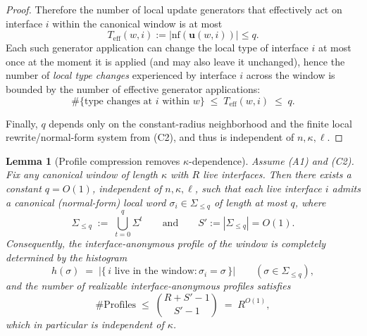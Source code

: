 \documentclass[12pt]{article}
\newtheorem{lemma}[theorem]{Lemma}
\theoremstyle{definition}
\theoremstyle{remark}
\begin{document}
\begin{proof}
Therefore the number of local update generators that effectively act on interface
$i$ within the canonical window is at most
\[
T_{\mathrm{eff}}(w,i) := |\mathrm{nf}(\mathbf{u}(w,i))| \le q.
\]
Each such generator application can change the local type of interface $i$ at most
once at the moment it is applied (and may also leave it unchanged), hence the
number of \emph{local type changes} experienced by interface $i$ across the window
is bounded by the number of effective generator applications:
\[
\#\{\text{type changes at } i \text{ within } w\}
\;\le\;
T_{\mathrm{eff}}(w,i)
\;\le\;
q.
\]

Finally, $q$ depends only on the constant-radius neighborhood and the finite local
rewrite/normal-form system from (C2), and thus is independent of $n,\kappa,\ell$.
\end{proof}


\begin{lemma}[Profile compression removes $\kappa$-dependence]
\label{lem:profile-compression-removes-kappa}
Assume (A1) and (C2). Fix any canonical window of length $\kappa$ with $R$ live
interfaces. Then there exists a constant $q=O(1)$, independent of $n,\kappa,\ell$,
such that each live interface $i$ admits a canonical (normal-form) local word
$\sigma_i \in \Sigma_{\le q}$ of length at most $q$, where
\[
\Sigma_{\le q} \;:=\; \bigcup_{t=0}^{q} \Sigma^{t}
\qquad\text{and}\qquad
S' := |\Sigma_{\le q}| = O(1).
\]
Consequently, the interface-anonymous profile of the window is completely
determined by the histogram
\[
h(\sigma) \;=\; \bigl|\{\, i \text{ live in the window} : \sigma_i=\sigma \,\}\bigr|
\qquad (\sigma\in\Sigma_{\le q}),
\]
and the number of realizable interface-anonymous profiles satisfies
\[
\#\mathrm{Profiles}
\;\le\;
\binom{R+S'-1}{S'-1}
\;=\;
R^{O(1)},
\]
which in particular is independent of $\kappa$.
\end{lemma}
\end{document}
